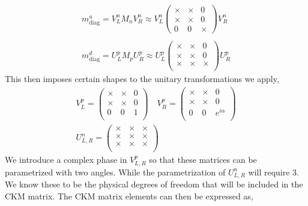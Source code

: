\begin{equation}
\begin{split}
m^u_{\text{diag}} = V_L^n M_n V_R^n \approx V_L^n \begin{pmatrix}
\times & \times & 0 \\
\times & \times & 0 \\
0 & 0 & \times 
\end{pmatrix}  V_R^n  \\
\\ 
m^d_{\text{diag}} = U_L^p  M_p U_R^p \approx U_L^p \begin{pmatrix}
\times & \times & 0 \\
\times & \times & 0 \\
\times & \times & \times \\ \end{pmatrix} U_R^p 
\end{split} 
\end{equation}
This then imposes certain shapes to the unitary transformations we apply,
\begin{equation}
\begin{gathered}
V^{p}_{L} = \begin{pmatrix}
\times & \times & 0 \\ 
\times & \times & 0 \\
0 & 0 & 1 \\ 
\end{pmatrix} \quad  V^{p}_{R} = \begin{pmatrix}
\times & \times & 0 \\ 
\times & \times & 0 \\
0 & 0 & e^{i\alpha}  \\ 
\end{pmatrix}  \\ 
U^{n}_{L,R} = 
\begin{pmatrix}
\times & \times & \times \\ 
\times & \times & \times \\
\times & \times & \times \\
\end{pmatrix}
\end{gathered} 
\end{equation}
We introduce a complex phase in $V^p_{L,R}$ so that these matrices can be parametrized with two angles. While the parametrization of $U^n_{L,R}$ will require 3. We know these to be the physical degrees of freedom that will be included in the CKM matrix. The CKM matrix elements can then be expressed as, 
